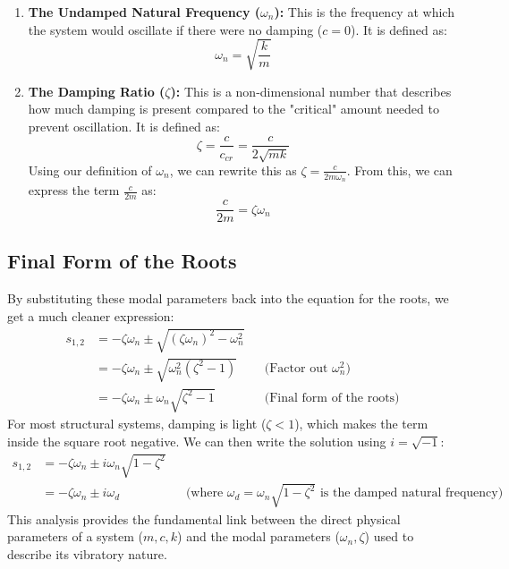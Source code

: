 \documentclass{article}
\begin{document}
\begin{enumerate}
    \item \textbf{The Undamped Natural Frequency ($\omega_n$):} This is the frequency at which the system would oscillate if there were no damping ($c=0$). It is defined as:
    $$ \omega_n = \sqrt{\frac{k}{m}} $$

    \item \textbf{The Damping Ratio ($\zeta$):} This is a non-dimensional number that describes how much damping is present compared to the "critical" amount needed to prevent oscillation. It is defined as:
    $$ \zeta = \frac{c}{c_{cr}} = \frac{c}{2\sqrt{mk}} $$
    Using our definition of $\omega_n$, we can rewrite this as $\zeta = \frac{c}{2m\omega_n}$. From this, we can express the term $\frac{c}{2m}$ as:
    $$ \frac{c}{2m} = \zeta\omega_n $$
\end{enumerate}

\subsection{Final Form of the Roots}
By substituting these modal parameters back into the equation for the roots, we get a much cleaner expression:
\begin{align}
    s_{1,2} &= -\zeta\omega_n \pm \sqrt{(\zeta\omega_n)^2 - \omega_n^2} \\
    &= -\zeta\omega_n \pm \sqrt{\omega_n^2(\zeta^2 - 1)} && \text{(Factor out } \omega_n^2\text{)} \\
    &= -\zeta\omega_n \pm \omega_n\sqrt{\zeta^2 - 1} && \text{(Final form of the roots)}
\end{align}
For most structural systems, damping is light ($\zeta < 1$), which makes the term inside the square root negative. We can then write the solution using $i = \sqrt{-1}$:
\begin{align}
    s_{1,2} &= -\zeta\omega_n \pm i\omega_n\sqrt{1 - \zeta^2} \\
    &= -\zeta\omega_n \pm i\omega_d && \text{(where } \omega_d = \omega_n\sqrt{1 - \zeta^2} \text{ is the damped natural frequency)}
\end{align}
This analysis provides the fundamental link between the direct physical parameters of a system ($m, c, k$) and the modal parameters ($\omega_n, \zeta$) used to describe its vibratory nature.

\newpage
\end{document}
